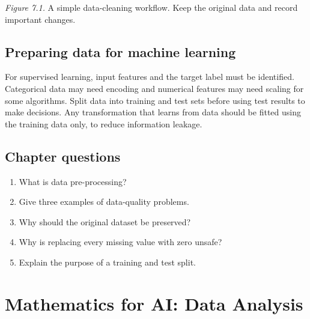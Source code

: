 \documentclass[11pt,openany,oneside]{book}
\begin{document}
\begin{center}
\end{center}
\textit{Figure 7.1.} A simple data-cleaning workflow. Keep the original data and record important changes.

\section{Preparing data for machine learning}
For supervised learning, input features and the target label must be identified. Categorical data may need encoding and numerical features may need scaling for some algorithms. Split data into training and test sets before using test results to make decisions. Any transformation that learns from data should be fitted using the training data only, to reduce information leakage.

\section{Chapter questions}
\begin{enumerate}
\item What is data pre-processing?
\item Give three examples of data-quality problems.
\item Why should the original dataset be preserved?
\item Why is replacing every missing value with zero unsafe?
\item Explain the purpose of a training and test split.
\end{enumerate}

\chapter{Mathematics for AI: Data Analysis}
\end{document}
